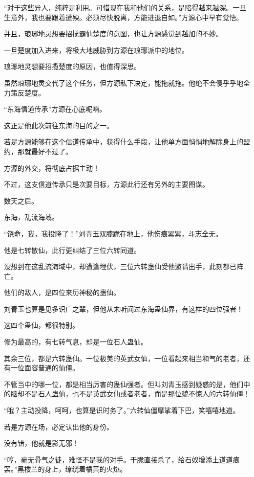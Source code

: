 \begin{this_body}
“对于这些异人，纯粹是利用。可惜现在我和他们的关系，是陷得越来越深。一旦生意外，我也要跟着遭殃。必须尽快脱离，方能进退自如。”方源心中早有觉悟。

并且，琅琊地灵想要招揽霸仙楚度的意图，也让方源感觉到越加的不妙。

一旦楚度加入进来，将极大地威胁到方源在琅琊派中的地位。

琅琊地灵想要招揽楚度的原因，也值得深思。

虽然琅琊地灵交代了这个任务，但方源私下决定，能拖就拖。他绝不会傻乎乎地全力策反楚度。

“东海信道传承”方源在心底呢喃。

这正是他此次前往东海的目的之一。

若是方源能够在这个信道传承中，获得什么手段，让他单方面悄悄地解除身上的盟约，那就最好不过了。

方源的外交，将彻底占据主动！

不过，这支信道传承只是次要目标，方源此行还有另外的主要图谋。

数天之后。

东海，乱流海域。

“饶命，我，我投降了！”刘青玉双膝跪在地上，他伤痕累累，斗志全无。

他是七转散仙，此行更纠结了三位六转同道。

没想到在这乱流海域中，却遭逢埋伏，三位六转蛊仙受他邀请出手，此刻都已阵亡。

他们的敌人，是四位来历神秘的蛊仙。

刘青玉也算是见多识广之辈，但他从未听闻过东海蛊仙界，有这样的四位强者！

这四个蛊仙，都很特别。

修为最高的，有七转气息，却是一位石人蛊仙。

其余三位，都是六转蛊仙。一位极美的英武女仙，一位看起来相当和气的老者，还有一位面容普通的仙僵。

不管当中的哪一位，都是相当厉害的蛊仙强者。但叫刘青玉感到疑惑的是，他们中的脑却不是石人蛊仙，也不是英武女仙或者老者，而是那位貌不惊人的六转仙僵！

“哦？主动投降，呵呵，也算是识时务了。”六转仙僵摩挲着下巴，笑嘻嘻地道。

若是方源在场，必定认出他的身份。

没有错，他就是影无邪！

“哼，毫无骨气之徒，难怪不是我的对手。干脆直接杀了，给石奴增添土道道痕罢。”黑楼兰的身上，缭绕着橘黄的火焰。


\end{this_body}
